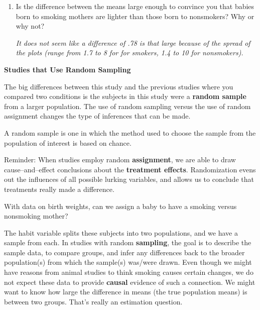 \begin{enumerate}
\begin{enumerate}
\begin{key}
  {\it Smoker: 6.306, nonsmoker: 7.084, difference: -.778 }
\end{key}

   
\item  Is the difference between the means large enough to convince
  you that babies born to smoking mothers are lighter than those born
  to nonsmokers?
  Why or why not?
\begin{students}
 \vspace{3cm}
\end{students}

\begin{key}
  {\it It does not seem like a difference of .78 is that large because of
the spread of the plots (range from 1.7 to 8 for for smokers, 1.4 to
10 for nonsmokers). }
\end{key}

\end{enumerate}
\end{enumerate}

{\bf Studies that Use Random Sampling}

 The big differences between this study and the previous studies where
 you compared two conditions is the subjects in this study were a
 {\bf random sample} from a larger population. The use of random sampling
 versus the use of random assignment  changes the type of
 inferences that can be made. 

A random sample is one in which the method used to choose the sample
from the population of interest is based on chance.

Reminder: When studies employ random {\bf assignment}, we are able to draw
cause--and--effect conclusions about the {\bf treatment effects}. 
Randomization evens out the influences of all possible lurking
variables, and allows us to conclude that treatments really made a difference.  


With data on birth weights, can we assign a baby to have  a smoking
versus nonsmoking mother?  \vspace{1cm}


The habit variable 
splits these subjects into two populations, and we have a sample
from each.  In studies with random {\bf sampling}, the goal is to
describe the sample data, to compare groups, and infer any differences
back to the broader population(s) from which the sample(s) was/were
drawn.  Even though we might have reasons from animal studies to think
smoking causes certain changes, we do not expect these data to provide
{\bf causal} evidence of such a connection.  We might want to know how large the
difference in means (the true population means) is between two groups.
That's really an estimation question. 

